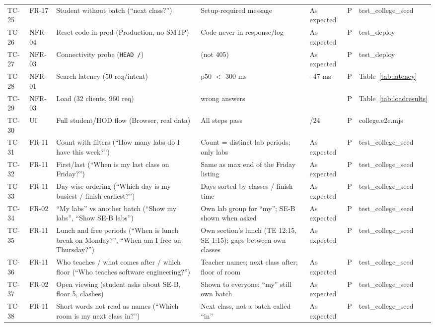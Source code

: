 \begin{longtable}{@{}p{1.15cm}p{1.2cm}>{\raggedright\arraybackslash}p{4.4cm}>{\raggedright\arraybackslash}p{3.6cm}>{\raggedright\arraybackslash}p{2.1cm}p{0.6cm}>{\raggedright\arraybackslash}p{2.3cm}@{}}
TC-25 & FR-17 & Student without batch (``next class?'') & Setup-required message & As expected & P & test\_\allowbreak{}college\_\allowbreak{}seed\\
TC-26 & NFR-04 & Reset code in prod (Production, no SMTP) & Code never in response/log & As expected & P & test\_\allowbreak{}deploy\\
TC-27 & NFR-03 & Connectivity probe (\texttt{HEAD /}) & 200 (not 405) & As expected & P & test\_\allowbreak{}deploy\\
TC-28 & NFR-01 & Search latency (50 req/intent) & p50 $<$ 300 ms & 37--47 ms & P & Table~\ref{tab:latency}\\
TC-29 & NFR-03 & Load (32 clients, 960 req) & 0 wrong answers & 0 & P & Table~\ref{tab:loadresults}\\
TC-30 & UI & Full student/HOD flow (Browser, real data) & All steps pass & 24/24 & P & college.e2e.mjs\\
TC-31 & FR-11 & Count with filters (``How many labs do I have this week?'') & Count = distinct lab periods; only labs & As expected & P & test\_\allowbreak{}college\_\allowbreak{}seed\\
TC-32 & FR-11 & First/last (``When is my last class on Friday?'') & Same as max end of the Friday listing & As expected & P & test\_\allowbreak{}college\_\allowbreak{}seed\\
TC-33 & FR-11 & Day-wise ordering (``Which day is my busiest / finish earliest?'') & Days sorted by classes / finish time & As expected & P & test\_\allowbreak{}college\_\allowbreak{}seed\\
TC-34 & FR-02 & ``My labs'' vs another batch (``Show my labs'', ``Show SE-B labs'') & Own lab group for ``my''; SE-B shown when asked & As expected & P & test\_\allowbreak{}college\_\allowbreak{}seed\\
TC-35 & FR-11 & Lunch and free periods (``When is lunch break on Monday?'', ``When am I free on Thursday?'') & Own section's lunch (TE 12:15, SE 1:15); gaps between own classes & As expected & P & test\_\allowbreak{}college\_\allowbreak{}seed\\
TC-36 & FR-11 & Who teaches / what comes after / which floor (``Who teaches software engineering?'') & Teacher names; next class after; floor of room & As expected & P & test\_\allowbreak{}college\_\allowbreak{}seed\\
TC-37 & FR-02 & Open viewing (student asks about SE-B, floor 5, clashes) & Shown to everyone; ``my'' still own batch & As expected & P & test\_\allowbreak{}college\_\allowbreak{}seed\\
TC-38 & FR-11 & Short words not read as names (``Which room is my next class in?'') & Next class, not a batch called ``in'' & As expected & P & test\_\allowbreak{}college\_\allowbreak{}seed\\
\bottomrule
\end{longtable}
\endgroup


